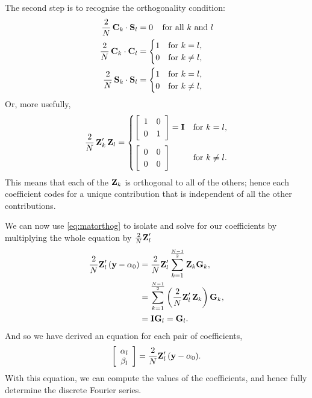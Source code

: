 \documentclass[11pt,twoside,a4paper]{article}
\begin{document}
The second step is to recognise the orthogonality condition:
\begin{align}
  \frac{2}{N}\,\mbox{{\bf C}}_k \cdot \mbox{{\bf S}}_l &=0 \;\;\;\;\text{for all $k$ and $l$} \nonumber\\
  \frac{2}{N}\,\mbox{{\bf C}}_k \cdot \mbox{{\bf C}}_l &=
  \begin{cases}
    1 & \text{for $k=l$},\\
    0 & \text{for $k\ne l$},
  \end{cases} \nonumber\\
  \frac{2}{N}\,\mbox{{\bf S}}_k \cdot \mbox{{\bf S}}_l &=
  \begin{cases}
    1 & \text{for $k=l$},\\
    0 & \text{for $k\ne l$},
  \end{cases}\nonumber
\end{align}
Or, more usefully, 
\begin{equation}
  \label{eq:matorthog}
  \frac{2}{N}\,\mbox{{\bf Z}}_k'\,\mbox{{\bf Z}}_l =
  \begin{cases}
    \left[\begin{array}{cc} 1 & 0 \\ 0 & 1\end{array}\right]=\mbox{{\bf I}} &
    \text{for $k=l$},\\[5mm]
    \left[\begin{array}{cc} 0 & 0 \\ 0 & 0\end{array}\right] &
    \text{for $k\ne l$}.
  \end{cases}
\end{equation}
This means that each of the $\mbox{{\bf Z}}_k$ is orthogonal to all of the
others; hence each coefficient codes for a unique contribution that is
independent of all the other contributions.

We can now use \autoref{eq:matorthog} to isolate and solve for our
coefficients by multiplying the whole equation by 
$\frac{2}{N}\mbox{{\bf Z}}_l'$
\begin{align}
  \frac{2}{N}\mbox{{\bf Z}}_l'\,(\mbox{{\bf y}}-\alpha_0) &=
  \frac{2}{N}\mbox{{\bf Z}}_l'\sum_{k=1}^{\frac{N-1}{2}}\mbox{{\bf Z}}_k\mbox{{\bf G}}_k,\nonumber\\
  &=\sum_{k=1}^{\frac{N-1}{2}}\left(\frac{2}{N}\mbox{{\bf Z}}_l'\,\mbox{{\bf Z}}_k\right)
  \mbox{{\bf G}}_k,\nonumber\\
  &= \mbox{{\bf I}}\mbox{{\bf G}}_l = \mbox{{\bf G}}_l.\nonumber
\end{align}
And so we have derived an equation for each pair of coefficients,
\begin{equation}
  \label{eq:coefpair}
  \left[\begin{array}{c}
      \alpha_l \\ \beta_l
    \end{array}\right] = \frac{2}{N}\mbox{{\bf Z}}_l'\,(\mbox{{\bf y}}-\alpha_0).
\end{equation}
With this equation, we can compute the values of the coefficients, and
hence fully determine the discrete Fourier series.  
\end{document}

